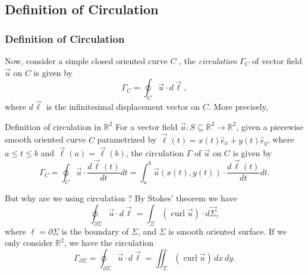 \documentclass[11pt,]{beamer}
\begin{document}
\subsection{Definition of Circulation}
\begin{frame}
\frametitle{Definition of Circulation}
	Now, consider a simple closed oriented curve $C$ , 
	the \textit{circulation} $\Gamma_C$ of vector field $\vec{u}$ on $C$ is given by
	\begin{equation}
	\Gamma_{C} = \oint_{C}\vec{u}\cdot d\vec{\ell},
	\end{equation}
	where $d\vec{\ell}$ is the infinitesimal displacement vector on $C$.
	More precisely, 
	\begin{block}{Definition of circulation in $\mathbb{R}^2$}
		For a vector field $\vec{u}:S\subseteq \mathbb{R}^2 \to \mathbb{R}^2$,
		given a piecewise smooth oriented curve $C$ parametrized by 
		$\vec{\ell}(t) = x(t)\hat{e}_x + y(t)\hat{e}_y$,
		where $a\leq t\leq b$ and $\vec{\ell}(a)=\vec{\ell}(b)$,
		the circulation $\Gamma$ of $\vec{u}$ on $C$ is given by
		\begin{equation}
		\Gamma_{C} = \oint_{C}\vec{u}\cdot\frac{d\vec{\ell}(t)}{dt}dt 
		= \int_{a}^{b} \vec{u}\left(x(t),y(t)\right)\cdot \frac{d\vec{\ell}(t)}{dt} dt.
		\end{equation}
	\end{block}
\end{frame}
\begin{frame}
	But why are we using circulation ? By Stokes' theorem we have
	\begin{equation}
	\oint_{\partial \Sigma} \vec{u}\cdot d\vec{\ell} 
	= \int_{\Sigma} \left(\operatorname{curl}\vec{u}\right)\cdot d\vec{\Sigma},
	\end{equation}
	where $\ell = \partial \Sigma$ is the boundary of $\Sigma$, 
	and $\Sigma$ is smooth oriented surface.
	If we only consider $\mathbb{R}^2$, we have the circulation
	\begin{equation}
	\Gamma_{\partial \Sigma} = \oint_{\partial \Sigma} \vec{u}\cdot d\vec{\ell} 
	= \iint_{\Sigma} \left(\operatorname{curl}\vec{u}\right)\,dx\,dy.
	\end{equation}
\end{frame}
\end{document}
